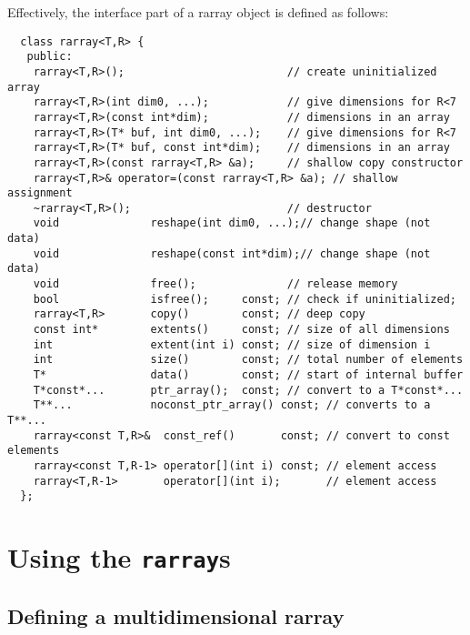 \documentclass[12pt,twoside]{article}
\begin{document}
Effectively, the interface part of a rarray object is defined as follows:%
\vspace{-8pt}%
\begin{framed}\vspace{-14pt}%
\begin{verbatim}
  class rarray<T,R> {
   public:    
    rarray<T,R>();                         // create uninitialized array
    rarray<T,R>(int dim0, ...);            // give dimensions for R<7
    rarray<T,R>(const int*dim);            // dimensions in an array
    rarray<T,R>(T* buf, int dim0, ...);    // give dimensions for R<7
    rarray<T,R>(T* buf, const int*dim);    // dimensions in an array
    rarray<T,R>(const rarray<T,R> &a);     // shallow copy constructor   
    rarray<T,R>& operator=(const rarray<T,R> &a); // shallow assignment
    ~rarray<T,R>();                        // destructor 
    void              reshape(int dim0, ...);// change shape (not data)
    void              reshape(const int*dim);// change shape (not data)
    void              free();              // release memory
    bool              isfree();     const; // check if uninitialized;
    rarray<T,R>       copy()        const; // deep copy
    const int*        extents()     const; // size of all dimensions 
    int               extent(int i) const; // size of dimension i
    int               size()        const; // total number of elements
    T*                data()        const; // start of internal buffer
    T*const*...       ptr_array();  const; // convert to a T*const*... 
    T**...            noconst_ptr_array() const; // converts to a T**... 
    rarray<const T,R>&  const_ref()       const; // convert to const elements
    rarray<const T,R-1> operator[](int i) const; // element access
    rarray<T,R-1>       operator[](int i);       // element access
  };
\end{verbatim}
\end{framed}

\section{Using the {\tt rarray}s}

\subsection{Defining a multidimensional rarray}
\end{document}

